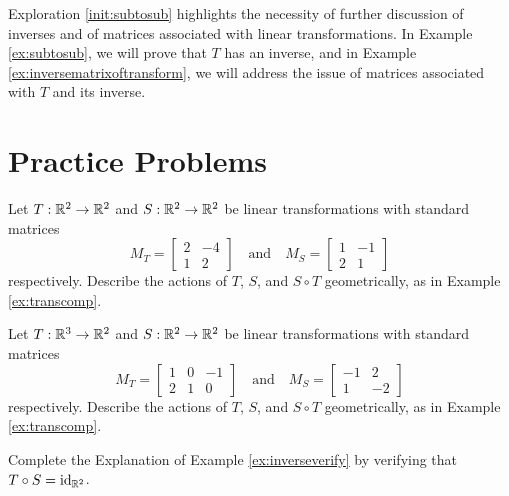 \documentclass{ximera}
\begin{document}
Exploration \ref{init:subtosub} highlights the necessity of further discussion of inverses and of matrices associated with linear transformations.  In Example \ref{ex:subtosub}, we will prove that $T$ has an inverse, and in Example \ref{ex:inversematrixoftransform}, we will address the issue of matrices associated with $T$ and its inverse.


\section*{Practice Problems}
\begin{problem}\label{prob:geometryoflintrans1}
Let $T:\mathbb{R}^2\rightarrow \mathbb{R}^2$ and $S:\mathbb{R}^2\rightarrow \mathbb{R}^2$ be linear transformations with standard matrices 
$$M_T=\begin{bmatrix}2&-4\\1&2\end{bmatrix}\quad\text{and}\quad M_S=\begin{bmatrix}1&-1\\2&1\end{bmatrix}$$
respectively.  Describe the actions of $T$, $S$, and $S\circ T$ geometrically, as in Example \ref{ex:transcomp}.
\end{problem}

\begin{problem}\label{prob:geometryoflintrans2}
Let $T:\mathbb{R}^3\rightarrow \mathbb{R}^2$ and $S:\mathbb{R}^2\rightarrow \mathbb{R}^2$ be linear transformations with standard matrices 
$$M_T=\begin{bmatrix}1&0&-1\\2&1&0\end{bmatrix}\quad\text{and}\quad M_S=\begin{bmatrix}-1&2\\1&-2\end{bmatrix}$$
respectively.  Describe the actions of $T$, $S$, and $S\circ T$ geometrically, as in Example \ref{ex:transcomp}.
\end{problem}

\begin{problem}\label{prob:completeinverseverify}
Complete the Explanation of Example \ref{ex:inverseverify} by verifying that $T\circ S=\text{id}_{\mathbb{R}^2}$.
\end{problem}
\end{document}
